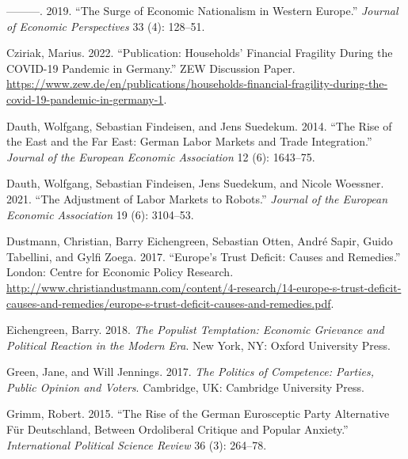 \documentclass[
]{article}
\newlength{\cslhangindent}
\newlength{\cslentryspacingunit} %
\newenvironment{CSLReferences}[2] %
 {%
  \setlength{\parindent}{0pt}
  \ifodd #1
  \let\oldpar\par
  \def\par{\hangindent=\cslhangindent\oldpar}
  \fi
  \setlength{\parskip}{#2\cslentryspacingunit}
 }%
 {}
\begin{document}
\begin{CSLReferences}{1}{0}
\leavevmode{}%
---------. 2019. {``The {Surge} of {Economic} {Nationalism} in {Western}
{Europe}.''} \emph{Journal of Economic Perspectives} 33 (4): 128--51.

\leavevmode{}%
Cziriak, Marius. 2022. {``Publication: {Households}' {Financial}
{Fragility} {During} the {COVID}-19 {Pandemic} in {Germany}.''} {ZEW}
{Discussion} {Paper}.
\url{https://www.zew.de/en/publications/households-financial-fragility-during-the-covid-19-pandemic-in-germany-1}.

\leavevmode{}%
Dauth, Wolfgang, Sebastian Findeisen, and Jens Suedekum. 2014. {``The
{Rise} of the {East} and the {Far} {East}: {German} {Labor} {Markets}
and {Trade} {Integration}.''} \emph{Journal of the European Economic
Association} 12 (6): 1643--75.

\leavevmode{}%
Dauth, Wolfgang, Sebastian Findeisen, Jens Suedekum, and Nicole
Woessner. 2021. {``The {Adjustment} of {Labor} {Markets} to {Robots}.''}
\emph{Journal of the European Economic Association} 19 (6): 3104--53.

\leavevmode{}%
Dustmann, Christian, Barry Eichengreen, Sebastian Otten, André Sapir,
Guido Tabellini, and Gylfi Zoega. 2017. {``Europe's {Trust} {Deficit}:
{Causes} and {Remedies}.''} London: Centre for Economic Policy Research.
\url{http://www.christiandustmann.com/content/4-research/14-europe-s-trust-deficit-causes-and-remedies/europe-s-trust-deficit-causes-and-remedies.pdf}.

\leavevmode{}%
Eichengreen, Barry. 2018. \emph{The {Populist} {Temptation}: {Economic}
{Grievance} and {Political} {Reaction} in the {Modern} {Era}}. New York,
NY: Oxford University Press.

\leavevmode{}%
Green, Jane, and Will Jennings. 2017. \emph{The {Politics} of
{Competence}: {Parties}, {Public} {Opinion} and {Voters}}. Cambridge,
UK: Cambridge University Press.

\leavevmode{}%
Grimm, Robert. 2015. {``The Rise of the {German} {Eurosceptic} Party
{Alternative} Für {Deutschland}, Between Ordoliberal Critique and
Popular Anxiety.''} \emph{International Political Science Review} 36
(3): 264--78.


\end{CSLReferences}
\end{document}
